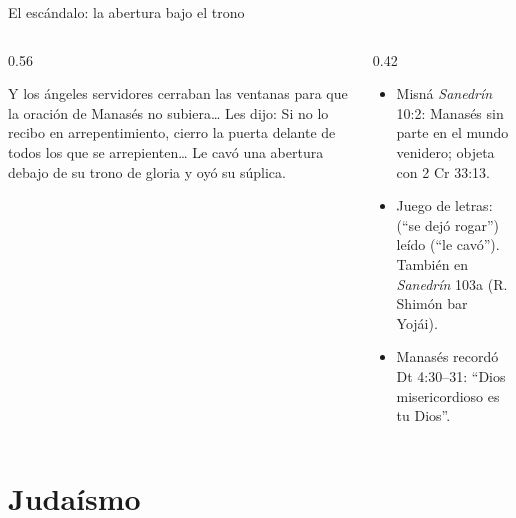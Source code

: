 \begin{frame}{El escándalo: la abertura bajo el trono}
\begin{columns}[t,onlytextwidth]
\begin{column}{0.56\textwidth}
\begin{cita}Y los ángeles servidores cerraban las ventanas para que la oración de Manasés no subiera\ldots{} Les dijo: Si no lo recibo en arrepentimiento, cierro la puerta delante de todos los que se arrepienten\ldots{} Le cavó una abertura debajo de su trono de gloria y oyó su súplica.\end{cita}
\centering{}
\end{column}
\begin{column}{0.42\textwidth}\scriptsize\RaggedRight
\begin{itemize}
\item Misná \emph{Sanedrín} 10:2: Manasés sin parte en el mundo venidero;  objeta con 2 Cr 33:13.
\item Juego de letras:  (``se dejó rogar'') leído  (``le cavó''). También en \emph{Sanedrín} 103a (R. Shimón bar Yojái).
\item Manasés recordó Dt 4:30--31: ``Dios misericordioso es \SENOR{} tu Dios''.
\end{itemize}
\end{column}
\end{columns}
\end{frame}

\section{Judaísmo}

